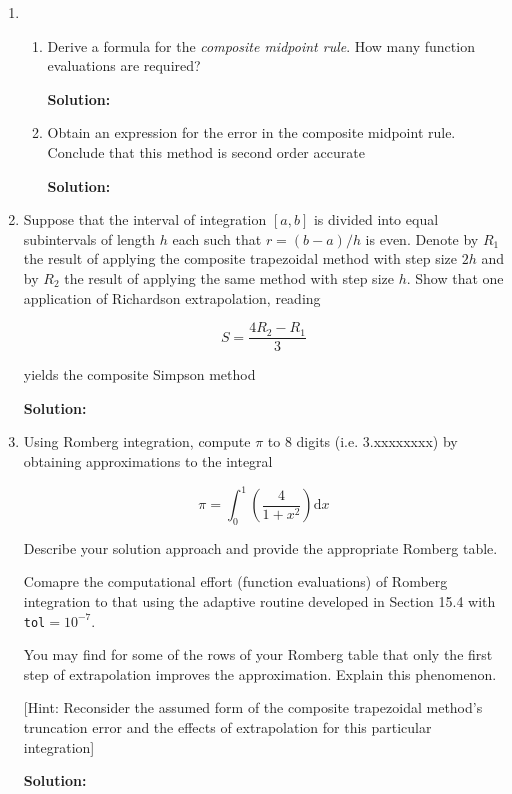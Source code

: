 \documentclass[12pt]{article}
\begin{document}
\begin{enumerate}
\begin{enumerate}
{\bf Solution:}

\end{enumerate}

\item 

\begin{enumerate}
\item Derive a formula for the {\em composite midpoint rule}. How many function evaluations are required?

{\bf Solution:}

\item Obtain an expression for the error in the composite midpoint rule. Conclude that this method is second order accurate

{\bf Solution:}
\end{enumerate}

\item Suppose that the interval of integration $[a, b]$ is divided into equal subintervals of length $h$ each such that $r = (b - a)/h$ is even. Denote by $R_{1}$ the result of applying the composite trapezoidal method with step size $2h$ and by $R_{2}$ the result of applying the same method with step size $h$. Show that one application of Richardson extrapolation, reading 

\[
S = \frac{4R_{2} - R_{1}}{3}
\]

yields the composite Simpson method

{\bf Solution:}

\item Using Romberg integration, compute $\pi$ to 8 digits (i.e. 3.xxxxxxxx) by obtaining approximations to the integral

\[
\pi = \int_{0}^{1}\left( \frac{4}{1 + x^{2}}\right)\text{d}x
\]

Describe your solution approach and provide the appropriate Romberg table.

Comapre the computational effort (function evaluations) of Romberg integration to that using the adaptive routine developed in Section 15.4 with {\tt tol}$= 10^{-7}$.

You may find for some of the rows of your Romberg table that only the first step of extrapolation improves the approximation. Explain this phenomenon.

[Hint: Reconsider the assumed form of the composite trapezoidal method's truncation error and the effects of extrapolation for this particular integration]

{\bf Solution:}

\end{enumerate}
\end{document}
